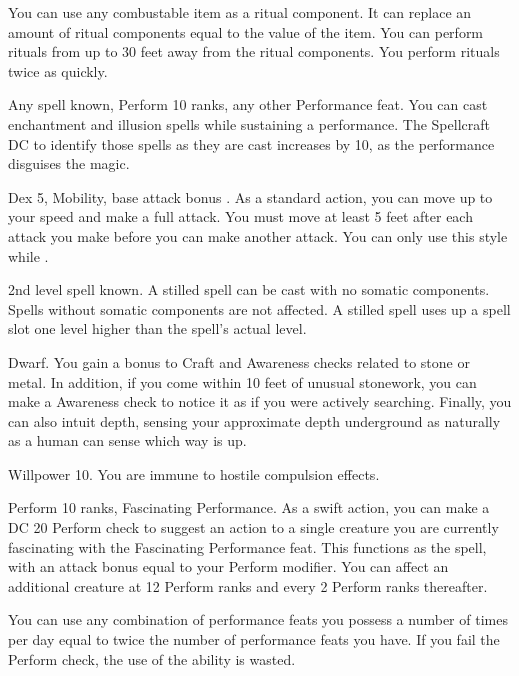  \x
{}
You can use any combustable item as a ritual component.
It can replace an amount of ritual components equal to the value of the item.
You can perform rituals from up to 30 feet away from the ritual components.
You perform rituals twice as quickly.

\featpres Any spell known, Perform 10 ranks, any other Performance feat.
\featben You can cast enchantment and illusion spells while sustaining a performance.
The Spellcraft DC to identify those spells as they are cast increases by 10, as the performance disguises the magic.

\featpres Dex 5, Mobility, base attack bonus .
\featben As a standard action, you can move up to your speed and make a full attack.
You must move at least 5 feet after each attack you make before you can make another attack.
You can only use this style while \unencumbered.

\featpre 2nd level spell known.
\featben A stilled spell can be cast with no somatic components.
Spells without somatic components are not affected.
A stilled spell uses up a spell slot one level higher than the spell's actual level.

\featpre Dwarf.
\featben You gain a  bonus to Craft and Awareness checks related to stone or metal.
In addition, if you come within 10 feet of unusual stonework, you can make a Awareness check to notice it as if you were actively searching.
Finally, you can also intuit depth, sensing your approximate depth underground as naturally as a human can sense which way is up.

\featpre Willpower 10.
\featben You are immune to hostile compulsion effects.

\featpres Perform 10 ranks, Fascinating Performance.
\featben As a swift action, you can make a DC 20 Perform check to suggest an action to a single creature you are currently fascinating with the Fascinating Performance feat.
This functions as the 
spell, with an attack bonus equal to your Perform modifier.
You can affect an additional creature at 12 Perform ranks and every 2 Perform ranks thereafter.

You can use any combination of performance feats you possess a number of times per day equal to twice the number of performance feats you have.
If you fail the Perform check, the use of the ability is wasted.

